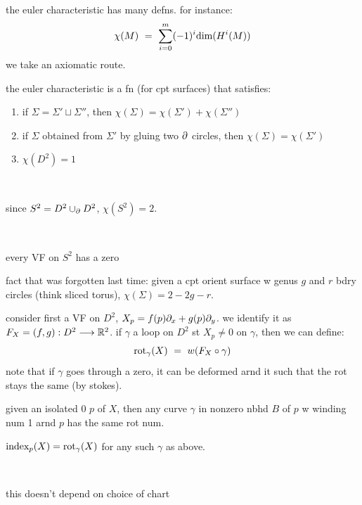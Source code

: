 the euler characteristic has many defns. for instance:
\begin{equation*}
	\chi(M) \ = \ \sum_{i=0}^{m}(-1)^{i}\trm{dim}(H^{i}(M))
\end{equation*}
we take an axiomatic route.

\begin{defn}
	the euler characteristic is a fn (for cpt surfaces) that satisfies:
	\begin{enumerate}[E1)]
		\item if $\Sigma=\Sigma'\sqcup\Sigma''$, then $\chi(\Sigma)=\chi(\Sigma')+\chi(\Sigma'')$
		\item if $\Sigma$ obtained from $\Sigma'$ by gluing two $\partial$ circles, then
			$\chi(\Sigma)=\chi(\Sigma')$
		\item $\chi(D^{2})=1$
	\end{enumerate}
\end{defn} \

\begin{xmp}
	since $S^{2}=D^{2}\cup_{\partial}D^{2}$, $\chi(S^{2})=2$.
\end{xmp} \

\begin{crll}[title=Hairy Ball Theorem]
	every VF on $S^{2}$ has a zero
\end{crll}

fact that was forgotten last time:
given a cpt orient surface w genus $g$ and $r$ bdry circles (think sliced torus),
$\chi(\Sigma)=2-2g-r$.

consider first a VF on $D^{2}$, $X_{p}=f(p)\partial_{x}+g(p)\partial_{y}$.
we identify it as $F_{X}=(f,g):D^{2}\longrightarrow\mathbb{R}^{2}$.
if $\gamma$ a loop on $D^{2}$ st $X_{p}\neq0$ on $\gamma$, then
we can define:
\begin{equation*}
	\trm{rot}_{\gamma}(X) \ = \ w(F_{X}\circ\gamma)
\end{equation*}
note that if $\gamma$ goes through a zero, it can be deformed arnd it such that
the rot stays the same (by stokes).

given an isolated 0 $p$ of $X$, then any curve $\gamma$ in nonzero nbhd $B$ of $p$
w winding num 1 arnd $p$ has the same rot num.

\begin{defn}
	$\textrm{index}_{p}(X)=\textrm{rot}_{\gamma}(X)$ for any such $\gamma$ as above.
\end{defn} \

\begin{exr}
	this doesn't depend on choice of chart
\end{exr}

